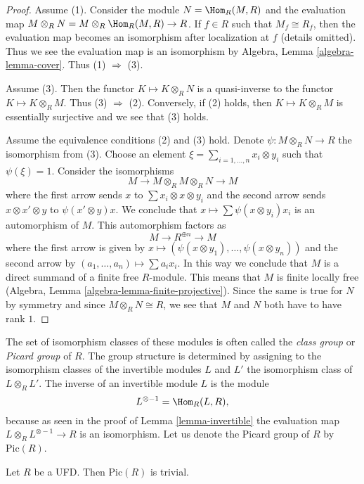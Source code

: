 \begin{proof}
Assume (1). Consider the module $N = \Hom_R(M, R)$ and the evaluation
map $M \otimes_R N = M \otimes_R \Hom_R(M, R) \to R$. If $f \in R$
such that $M_f \cong R_f$, then the evaluation map becomes an isomorphism
after localization at $f$ (details omitted). Thus we see the evaluation
map is an isomorphism by Algebra, Lemma \ref{algebra-lemma-cover}.
Thus (1) $\Rightarrow$ (3).

\medskip\noindent
Assume (3). Then the functor $K \mapsto K \otimes_R N$ is a quasi-inverse
to the functor $K \mapsto K \otimes_R M$. Thus (3) $\Rightarrow$ (2).
Conversely, if (2) holds, then $K \mapsto K \otimes_R M$ is essentially
surjective and we see that (3) holds.

\medskip\noindent
Assume the equivalence conditions (2) and (3) hold. Denote
$\psi : M \otimes_R N \to R$ the isomorphism from (3).
Choose an element $\xi = \sum_{i = 1, \ldots, n} x_i \otimes y_i$
such that $\psi(\xi) = 1$. Consider the isomorphisms
$$
M \to M \otimes_R M \otimes_R N \to M
$$
where the first arrow sends $x$ to $\sum x_i \otimes x \otimes y_i$
and the second arrow sends $x \otimes x' \otimes y$ to $\psi(x' \otimes y)x$.
We conclude that $x \mapsto \sum \psi(x \otimes y_i)x_i$ is
an automorphism of $M$. This automorphism factors as
$$
M \to R^{\oplus n} \to M
$$
where the first arrow is given by
$x \mapsto (\psi(x \otimes y_1), \ldots, \psi(x \otimes y_n))$
and the second arrow by $(a_1, \ldots, a_n) \mapsto \sum a_i x_i$.
In this way we conclude that $M$ is a direct summand of a finite free
$R$-module. This means that $M$ is finite locally free
(Algebra, Lemma \ref{algebra-lemma-finite-projective}).
Since the same is true for $N$ by symmetry and since
$M \otimes_R N \cong R$, we see that
$M$ and $N$ both have to have rank $1$.
\end{proof}

\noindent
The set of isomorphism classes of these
modules is often called the {\it class group} or {\it Picard group}
of $R$. The group structure is determined by assigning to
the isomorphism classes of the invertible modules $L$ and $L'$
the isomorphism class of $L \otimes_R L'$.
The inverse of an invertible module $L$ is the module
$$
L^{\otimes -1} = \Hom_R(L, R),
$$
because as seen in the proof of Lemma \ref{lemma-invertible}
the evaluation map $L \otimes_R L^{\otimes -1} \to R$ is an isomorphism.
Let us denote the Picard group of $R$ by $\text{Pic}(R)$.

\begin{lemma}
\label{lemma-UFD-Pic-trivial}
Let $R$ be a UFD. Then $\text{Pic}(R)$ is trivial.
\end{lemma}

